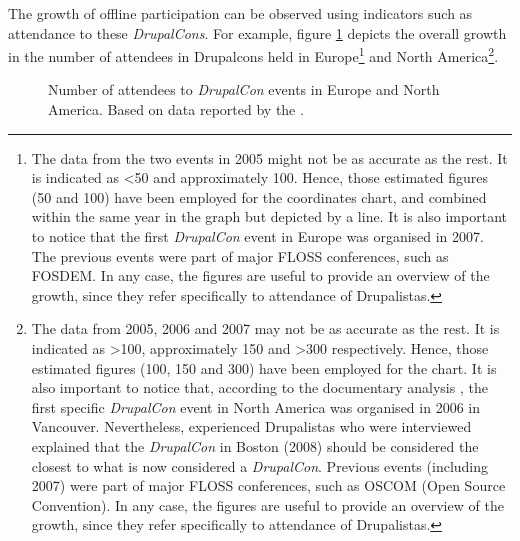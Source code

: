The growth of offline participation can be observed using indicators such as attendance to these \textit{DrupalCons}. For example, figure \ref{dcons-eu-na} depicts the overall growth in the number of attendees in Drupalcons held in Europe\footnote{The data from the two events in 2005 might not be as accurate as the rest. It is indicated as \textless 50 and approximately 100. Hence, those estimated figures (50 and 100) have been employed for the coordinates chart, and combined within the same year in the graph but depicted by a line. It is also important to notice that the first \textit{DrupalCon} event in Europe was organised in 2007. The previous events were part of major FLOSS conferences, such as FOSDEM. In any case, the figures are useful to provide an overview of the growth, since they refer specifically to attendance of Drupalistas.} and North America\footnote{The data from 2005, 2006 and 2007 may not be as accurate as the rest. It is indicated as \textgreater 100, approximately 150 and \textgreater 300 respectively. Hence, those estimated figures (100, 150 and 300) have been employed for the chart.  It is also important to notice that, according to the documentary analysis  \parencite{drupalcon-vancouver:2016:Online}, the first specific \textit{DrupalCon} event in North America was organised in 2006 in Vancouver.  Nevertheless, experienced Drupalistas who were interviewed explained that the \textit{DrupalCon} in Boston (2008) should be considered the closest to what is now considered a \textit{DrupalCon}. Previous events (including 2007) were part of major FLOSS conferences, such as OSCOM (Open Source Convention). In any case, the figures are useful to provide an overview of the growth, since they refer specifically to attendance of Drupalistas.}.



\begin{figure}[H]
\centering
{}
\caption[Number of attendees to \textit{DrupalCon} events in Europe and North America]%
    {Number of attendees to \textit{DrupalCon} events in Europe and North America. Based on data reported by the \textcite{drupal-association-dcons-attendance:2016:Online}.}
	\label{dcons-eu-na}
\end{figure}

